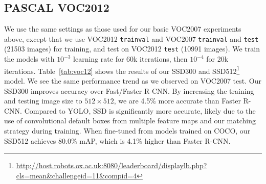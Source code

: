 \documentclass[runningheads]{llncs}
\begin{document}
\subsection{PASCAL VOC2012}
We use the same settings as those used for our basic VOC2007 experiments above, except that we use VOC2012 \texttt{trainval} and VOC2007 \texttt{trainval} and \texttt{test} (21503 images) for training, and test on VOC2012 \texttt{test} (10991 images). We train the models with $10^{-3}$ learning rate for 60k iterations, then $10^{-4}$ for 20k iterations. Table~\ref{tab:voc12} shows the results of our SSD300 and SSD512\footnote{\ssmall\url{http://host.robots.ox.ac.uk:8080/leaderboard/displaylb.php?cls=mean&challengeid=11&compid=4}} model. We see the same performance trend as we observed on VOC2007 test. Our SSD300 improves accuracy over Fast/Faster R-CNN. By increasing the training and testing image size to $512\times 512$, we are 4.5\% more accurate than Faster R-CNN. Compared to YOLO, SSD is significantly more accurate, likely due to  the use of convolutional default boxes from multiple feature maps and our matching strategy during training. When fine-tuned from models trained on COCO, our SSD512 achieves 80.0\% mAP, which is 4.1\% higher than Faster R-CNN.
\end{document}
